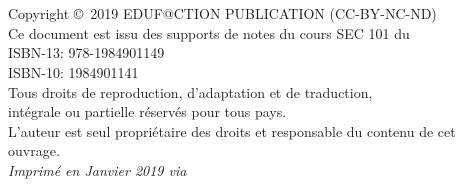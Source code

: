 
\newpage

~\vfill
\thispagestyle{empty}

\noindent {\Huge\ccbyncndeu}\\ 
\noindent Copyright \copyright\ 2019 EDUF@CTION PUBLICATION (CC-BY-NC-ND)\\ %

\noindent Ce document est issu des supports de notes du cours SEC 101 du \uCnam \\
ISBN-13: 978-1984901149 \\
ISBN-10: 1984901141 \\
Tous droits de reproduction, d’adaptation et de traduction,\\
intégrale ou partielle réservés pour tous pays.\\
L’auteur est seul propriétaire des droits et responsable du contenu de cet ouvrage.\\

\noindent \textit{Imprimé en Janvier 2019 via \printer} %